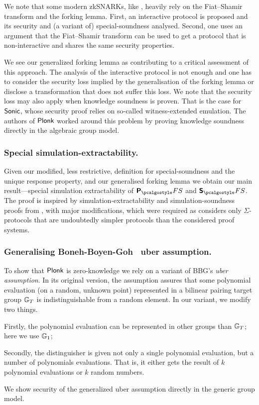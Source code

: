 \documentclass[runningheads,11pt]{llncs}
\begin{document}
We note that some modern zkSNARKs, like \cite{SP:BBBPWM18,CCS:MBKM19}, heavily rely on
the Fiat--Shamir transform and the forking lemma. First, an interactive
protocol is proposed and its security and (a variant of) special-soundness analysed. Second,
one uses an argument that the Fiat--Shamir transform can be used to get a
protocol that is non-interactive and shares the same security properties.

  
We see our generalized forking lemma as contributing to a critical assessment of
this approach. The analysis of the interactive protocol is not enough and one
has to consider the security loss implied by the generalisation of the forking
lemma or disclose a transformation that does not suffer this loss. We note that the security loss may also apply when knowledge
soundness is proven. That is the case for ${\textnormal{\textsf{Sonic}}}$, whose security proof relies
on so-called witness-extended emulation. The authors of $\textnormal{\textsf{Plonk}}$ worked around this
problem by proving knowledge soundness directly in the algebraic group model.

\subsubsection{Special simulation-extractability.} Given our modified, less
restrictive, definition for special-soundness and the unique response property,
and our generalised forking lemma we obtain our main
result---special simulation extractability of $\plonkprotfs$ and $\sonicprotfs$. The
proof is inspired by simulation-extractability and simulation-soundness proofs
from \cite{INDOCRYPT:FKMV12}, with major modifications, which were required as
\cite{INDOCRYPT:FKMV12} considers only $\Sigma$-protocols
that are undoubtedly simpler protocols than the considered proof systems.

\subsubsection{Generalising Boneh-Boyen-Goh~\cite{EC:BonBoyGoh05} uber assumption.}
To show that $\textnormal{\textsf{Plonk}}$ is zero-knowledge we rely on a variant of
BBG's \emph{uber assumption}. In its original version, the
assumption assures that some polynomial evaluation (on a random, unknown point)
represented in a bilinear pairing target group $\mathbb{G}_T$ is indistinguishable
from a random element. In our variant, we modify two things.
\begin{inparaenum}[(1)]
\item Firstly, the polynomial evaluation can be represented in other groups
  than $\mathbb{G}_T$; here we use $\mathbb{G}_1$;
\item Secondly, the distinguisher is given not only a single polynomial evaluation,
  but a number of polynomials  evaluations. That is, it either gets the result of $k$ polynomial
  evaluations or $k$ random numbers.
\end{inparaenum}
We show security of the generalized uber assumption directly in the generic
group model.
\end{document}
